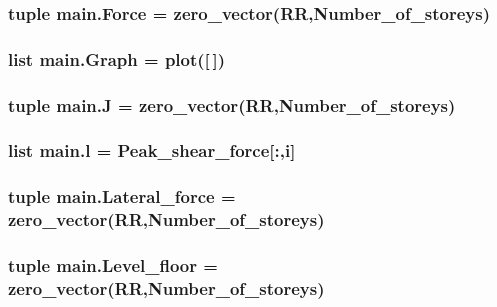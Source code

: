 \subsubsection[{Force}]{\setlength{\rightskip}{0pt plus 5cm}tuple main.\+Force = zero\+\_\+vector(R\+R,Number\+\_\+of\+\_\+storeys)}\label{namespacemain_a4612305e50326c88dea04736a647c238}
\hypertarget{namespacemain_ad40f6b3437e83a0385177ac65a317b97}{}
\subsubsection[{Graph}]{\setlength{\rightskip}{0pt plus 5cm}list main.\+Graph = plot(\mbox{[}$\,$\mbox{]})}\label{namespacemain_ad40f6b3437e83a0385177ac65a317b97}
\hypertarget{namespacemain_a00488f5887e168f7781b6fb94dd08518}{}
\subsubsection[{J}]{\setlength{\rightskip}{0pt plus 5cm}tuple main.\+J = zero\+\_\+vector(R\+R,Number\+\_\+of\+\_\+storeys)}\label{namespacemain_a00488f5887e168f7781b6fb94dd08518}
\hypertarget{namespacemain_a027916efc284622d928c1d8383917f6d}{}
\subsubsection[{l}]{\setlength{\rightskip}{0pt plus 5cm}list main.\+l = {\bf Peak\+\_\+shear\+\_\+force}\mbox{[}\+:,{\bf i}\mbox{]}}\label{namespacemain_a027916efc284622d928c1d8383917f6d}
\hypertarget{namespacemain_a8d395a4120126cf1de1d3f04b1fc3457}{}
\subsubsection[{Lateral\+\_\+force}]{\setlength{\rightskip}{0pt plus 5cm}tuple main.\+Lateral\+\_\+force = zero\+\_\+vector(R\+R,Number\+\_\+of\+\_\+storeys)}\label{namespacemain_a8d395a4120126cf1de1d3f04b1fc3457}
\hypertarget{namespacemain_aa6efadb1dc89cc9d5b75113b025fe962}{}
\subsubsection[{Level\+\_\+floor}]{\setlength{\rightskip}{0pt plus 5cm}tuple main.\+Level\+\_\+floor = zero\+\_\+vector(R\+R,Number\+\_\+of\+\_\+storeys)}\label{namespacemain_aa6efadb1dc89cc9d5b75113b025fe962}
\hypertarget{namespacemain_af6e3698b7f50fc004eb759d7c447fdb3}{}
